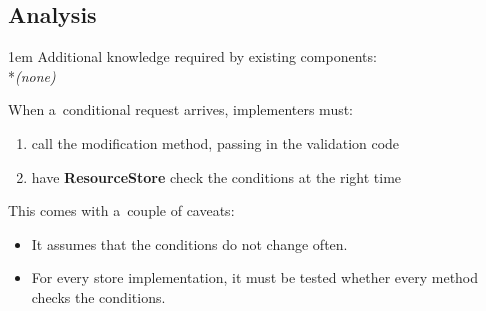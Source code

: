 \documentclass[10pt]{article}
\newenvironment{Note}
  {\begin{multicols}{3}%
     \parskip 1em}
  {\end{multicols}}
\begin{document}
\subsection*{Analysis}

\begin{Note}
Additional knowledge required by existing components:
\\*\emph{(none)}

When a~conditional request arrives, implementers must:
\begin{enumerate}
  \item call the modification method,
        passing in the validation code
  \item have \textbf{ResourceStore} check the conditions
        at the right time
\end{enumerate}

\bigskip
This comes with a~couple of caveats:
\begin{itemize}
  \item It assumes that the conditions do not change often.
  \item For every store implementation,
        it must be tested whether every method checks the conditions.
\end{itemize}

\columnbreak
\null


\columnbreak
\null

\end{Note}
\end{document}
